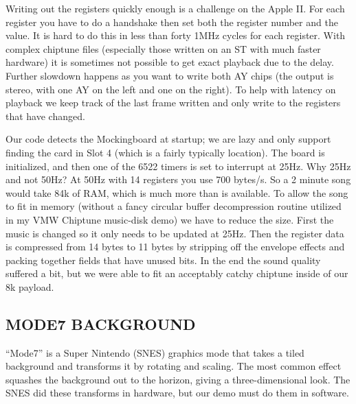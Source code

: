 \documentclass[twocolumn]{article}
\begin{document}

Writing out the registers quickly enough is a challenge on the Apple II.
For each register you have to do a handshake then set both the register 
number and the value.
It is hard to do this in less than forty 1MHz cycles for each register.
With complex chiptune files (especially those written on an ST with much
faster hardware) it is sometimes not possible to get exact playback
due to the delay.
Further slowdown happens as you want to write both AY chips (the output
is stereo, with one AY on the left and one on the right).
To help with latency on playback we keep track of the last frame written
and only write to the registers that have changed.


Our code detects the Mockingboard at startup; we are lazy and only support
finding the card in Slot 4 (which is a fairly typically location).
The board is initialized, and then one of the 6522 timers is set to
interrupt at 25Hz.
Why 25Hz and not 50Hz?  At 50Hz with 14 registers you use 700 bytes/s.
So a 2 minute song would take 84k of RAM, which is much more than is available.
To allow the song to fit in memory (without a fancy circular buffer
decompression routine utilized in my VMW Chiptune music-disk demo) we have
to reduce the size.
First the music is changed so it only needs to be updated at 25Hz.
Then the register data is compressed from 14 bytes to 11 bytes by stripping off
the envelope effects and packing together fields that have unused bits.
In the end the sound quality suffered a bit, but we were able to fit an
acceptably catchy chiptune inside of our 8k payload.

\subsection{MODE7 BACKGROUND}

``Mode7'' is a Super Nintendo (SNES) graphics mode that takes a tiled
background and transforms it by rotating and scaling.
The most common effect squashes the background out to the horizon, giving
a three-dimensional look.
The SNES did these transforms in hardware, but our demo must do
them in software.
\end{document}
